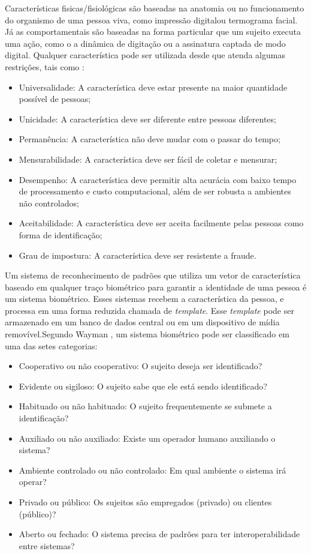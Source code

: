 Características fisicas/fisiológicas são baseadas na anatomia ou no funcionamento do organismo de uma pessoa viva, como impressão digitalou termograma facial. Já as comportamentais são baseadas na forma particular que um sujeito executa uma ação, como o a dinâmica de digitação ou a assinatura captada de modo digital. Qualquer característica pode ser utilizada desde que atenda algumas restrições, tais como \cite{maltoni2009handbook}:

\begin{itemize}
\item Universalidade: A característica deve estar presente na maior quantidade possível de pessoas;
\item Unicidade: A característica deve ser diferente entre pessoas diferentes;
\item Permanência: A característica não deve mudar com o passar do tempo;
\item Mensurabilidade: A característica deve ser fácil de coletar e mensurar;
\item Desempenho: A característica deve permitir alta acurácia com baixo tempo de processamento e custo computacional, além de ser robusta a ambientes não controlados;
\item Aceitabilidade: A característica deve ser aceita facilmente pelas pessoas como forma de identificação;
\item Grau de impostura: A característica deve ser resistente a fraude.
\end{itemize}

Um sistema de reconhecimento de padrões que utiliza um vetor de característica baseado em qualquer traço biométrico para garantir a identidade de uma pessoa é um sistema biométrico. Esses sistemas recebem a característica da pessoa, e processa em uma forma reduzida chamada de \textit{template}. Esse \textit{template} pode ser armazenado em um banco de dados central ou em um dispositivo de mídia removível.Segundo Wayman \cite{wayman2002}, um sistema biométrico pode ser classificado em uma das setes categorias: 

\begin{itemize}
\item Cooperativo ou não cooperativo: O sujeito deseja ser identificado?
\item Evidente ou sigiloso: O sujeito sabe que ele está sendo identificado?
\item Habituado ou não habituado: O sujeito frequentemente se submete a identificação?
\item Auxiliado ou não auxiliado: Existe um operador humano auxiliando o sistema?
\item Ambiente controlado ou não controlado: Em qual ambiente o sistema irá operar?
\item Privado ou público: Os sujeitos são empregados (privado) ou clientes (público)?
\item Aberto ou fechado: O sistema precisa de padrões para ter interoperabilidade entre sistemas?
\end{itemize}




